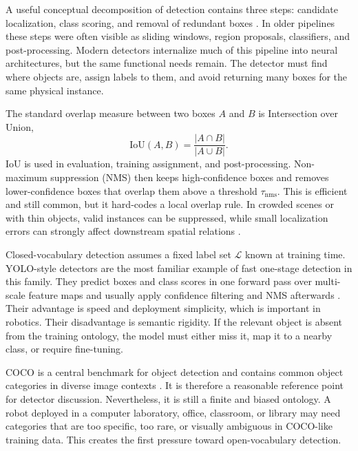 A useful conceptual decomposition of detection contains three steps: candidate localization, class scoring, and removal of redundant boxes \cite[Part XIII]{foundationsCVbook}. In older pipelines these steps were often visible as sliding windows, region proposals, classifiers, and post-processing. Modern detectors internalize much of this pipeline into neural architectures, but the same functional needs remain. The detector must find where objects are, assign labels to them, and avoid returning many boxes for the same physical instance.

The standard overlap measure between two boxes \(A\) and \(B\) is Intersection over Union,
\[
\mathrm{IoU}(A,B)=\frac{|A\cap B|}{|A\cup B|}.
\]
IoU is used in evaluation, training assignment, and post-processing. Non-maximum suppression (NMS) then keeps high-confidence boxes and removes lower-confidence boxes that overlap them above a threshold \(\tau_{\text{nms}}\). This is efficient and still common, but it hard-codes a local overlap rule. In crowded scenes or with thin objects, valid instances can be suppressed, while small localization errors can strongly affect downstream spatial relations \cite{hosang_learning_2017}.

Closed-vocabulary detection assumes a fixed label set \(\mathcal{L}\) known at training time. YOLO-style detectors are the most familiar example of fast one-stage detection in this family. They predict boxes and class scores in one forward pass over multi-scale feature maps and usually apply confidence filtering and NMS afterwards \cite{sapkota_ultralytics_2026}. Their advantage is speed and deployment simplicity, which is important in robotics. Their disadvantage is semantic rigidity. If the relevant object is absent from the training ontology, the model must either miss it, map it to a nearby class, or require fine-tuning.

COCO is a central benchmark for object detection and contains common object categories in diverse image contexts \cite{lin2015microsoftcococommonobjects}. It is therefore a reasonable reference point for detector discussion. Nevertheless, it is still a finite and biased ontology. A robot deployed in a computer laboratory, office, classroom, or library may need categories that are too specific, too rare, or visually ambiguous in COCO-like training data. This creates the first pressure toward open-vocabulary detection.

